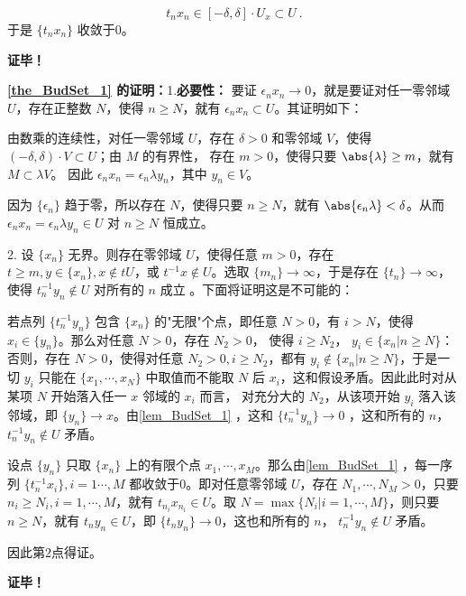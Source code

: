 \begin{equation}
t_nx_n\in[-\delta,\delta]\cdot U_x\subset U~.
\end{equation}
于是 $\{t_nx_n\}$ 收敛于0。

\textbf{证毕！}

\textbf{\autoref{the_BudSet_1} 的证明：}1.\textbf{必要性：} 要证 $\epsilon_n x_n\rightarrow0$，就是要证对任一零邻域 $U$，存在正整数 $N$，使得 $n\geq N$，就有 $\epsilon_n x_n\subset U$。其证明如下：

由数乘的连续性，对任一零邻域 $U$，存在 $\delta>0$ 和零邻域 $V$，使得 $(-\delta,\delta)\cdot V\subset U$；由 $M$ 的有界性， 存在 $m>0$，使得只要 $\abs{\lambda}\geq m$，就有 $M\subset\lambda V$。 因此 $\epsilon_nx_n=\epsilon_n \lambda y_n$，其中 $y_n\in V$。

因为 $\{\epsilon_n\}$ 趋于零，所以存在 $N$，使得只要 $n\geq N$，就有 $\abs{\epsilon_n\lambda}<\delta$。从而 $\epsilon_nx_n=\epsilon_n \lambda y_n\in U$ 对 $n\geq N$ 恒成立。


2. 设 $\{x_n\}$ 无界。则存在零邻域 $U$，使得任意 $m>0$，存在 $t\geq m,y\in\{x_n\},x\notin tU$，或 $t^{-1}x\notin U$。选取 $\{m_n\}\rightarrow\infty$，于是存在 $\{t_n\}\rightarrow\infty$，使得 $t_n^{-1}y_n\notin U$ 对所有的 $n$ 成立 。下面将证明这是不可能的：

若点列 $\{t_n^{-1}y_n\}$ 包含 $\{x_n\}$ 的"无限"个点，即任意 $N>0$，有 $i>N$，使得 $x_i\in\{y_n\}$。那么对任意 $N>0$，存在 $N_2>0$， 使得 $i\geq N_2$， $y_i\in \{x_n|n\geq N\}$：否则，存在 $N>0$，使得对任意 $N_2>0,i\geq N_2$，都有 $y_i\notin\{x_n|n\geq N\}$，于是一切 $y_i$ 只能在 $\{x_1,\cdots,x_N\}$ 中取值而不能取 $N$ 后 $x_i$，这和假设矛盾。因此此时对从某项 $N$ 开始落入任一 $x$ 邻域的 $x_i$ 而言， 对充分大的 $N_2$，从该项开始 $y_i$ 落入该邻域，即 $\{y_n\}\rightarrow x$。由\autoref{lem_BudSet_1} ，这和 $\{t_n^{-1}y_n\}\rightarrow0$ ，这和所有的 $n$，  $t_n^{-1}y_n\notin U$ 矛盾。 

 设点 $\{y_n\}$ 只取 $\{x_n\}$ 上的有限个点 $x_1,\cdots,x_M$。那么由\autoref{lem_BudSet_1} ，每一序列 $\{t_n^{-1}x_i\},i=1\cdots,M$ 都收敛于0。即对任意零邻域 $U$，存在 $N_1,\cdots,N_M>0$，只要 $n_i\geq N_i,i=1,\cdots,M$，就有 $t_{n_i}x_{n_i}\in U$。取 $N=\max\{N_i|i=1,\cdots,M\}$，则只要 $n\geq N$，就有 $t_n y_n\in U$，即 $\{t_n y_n\}\rightarrow 0$，这也和所有的 $n$，  $t_n^{-1}y_n\notin U$ 矛盾。

 因此第2点得证。


\textbf{证毕！}











